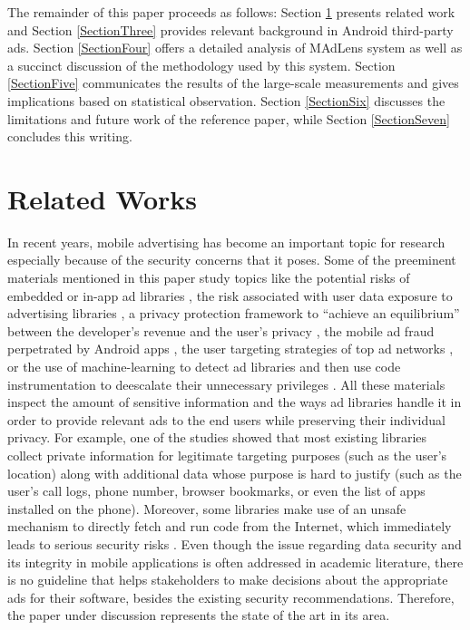 \documentclass[conference]{IEEEtran}
\begin{document}
The remainder of this paper proceeds as follows: Section \ref{SectionTwo} presents related work and Section \ref{SectionThree} provides relevant background in Android third-party ads. Section \ref{SectionFour} offers a detailed analysis of MAdLens system as well as a succinct discussion of the methodology used by this system. Section \ref{SectionFive} communicates the results of the large-scale measurements and gives implications based on statistical observation. Section \ref{SectionSix} discusses the limitations and future work of the reference paper, while Section \ref{SectionSeven} concludes this writing.

\section{Related Works}
\label{SectionTwo}
In recent years, mobile advertising has become an important topic for research especially because of the security concerns that it poses. Some of the preeminent materials mentioned in this paper study topics like the potential risks of embedded or in-app ad libraries \cite{Grace}, the risk associated with user data exposure to advertising libraries \cite{meng2016price}, a privacy protection framework to “achieve an equilibrium” between the developer’s revenue and the user’s privacy \cite{leontiadis2012don}, the mobile ad fraud perpetrated by Android apps \cite{crussell2014madfraud}, the user targeting strategies of top ad networks \cite{nath2015madscope}, or the use of machine-learning to detect ad libraries and then use code instrumentation to deescalate their unnecessary privileges \cite{liu2015efficient}.
All these materials inspect the amount of sensitive information and the ways ad libraries handle it in order to provide relevant ads to the end users while preserving their individual privacy. For example, one of the studies showed that most existing libraries collect private information for legitimate targeting purposes (such as the user’s location) along with additional data whose purpose is hard to justify (such as the user’s call logs, phone number, browser bookmarks, or even the list of apps installed on the phone). Moreover, some libraries make use of an unsafe mechanism to directly fetch and run code from the Internet, which immediately leads to serious security risks \cite{Grace}. 
Even though the issue regarding data security and its integrity in mobile applications is often addressed in academic literature, there is no guideline that helps stakeholders to make decisions about the appropriate ads for their software, besides the existing security recommendations. Therefore, the paper under discussion represents the state of the art in its area.
\end{document}
